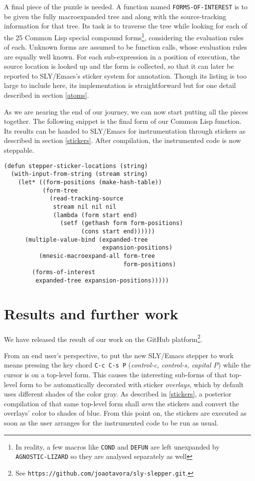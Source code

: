 \documentclass[sigconf]{acmart}
\begin{document}
A final piece of the puzzle is needed.  A function named
\texttt{FORMS-OF-INTEREST} is to be given the fully macroexpanded tree
and along with the source-tracking information for that tree.  Its
task is to traverse the tree while looking for each of the 25 Common
Lisp special compound forms\footnote{In reality, a few macros like
  \texttt{COND} and \texttt{DEFUN} are left unexpanded by
  \texttt{AGNOSTIC-LIZARD} so they are analysed separately as well},
considering the evaluation rules of each.  Unknown forms are assumed
to be function calls, whose evaluation rules are equally well known.
For each sub-expression in a position of execution, the source
location is looked up and the form is collected, so that it can later
be reported to SLY/Emacs's sticker system for annotation.  Though its
listing is too large to include here, its implementation is
straightforward but for one detail described in section \ref{atoms}.

As we are nearing the end of our journey, we can now start putting all
the pieces together. The following snippet is the final form of our
Common Lisp function. Its results can be handed to SLY/Emacs for
instrumentation through stickers as described in section
\ref{stickers}.  After compilation, the instrumented code is now
steppable.

\begin{verbatim}
(defun stepper-sticker-locations (string)
  (with-input-from-string (stream string)
    (let* ((form-positions (make-hash-table))
           (form-tree
             (read-tracking-source
              stream nil nil nil
              (lambda (form start end)
                (setf (gethash form form-positions)
                      (cons start end))))))
      (multiple-value-bind (expanded-tree
                            expansion-positions)
          (mnesic-macroexpand-all form-tree
                                  form-positions)
        (forms-of-interest
         expanded-tree expansion-positions)))))
\end{verbatim}

\section{Results and further work}\label{results}

We have released the result of our work on the GitHub
platform\footnote{See
  \texttt{https://github.com/joaotavora/sly-slepper.git}.}.

From an end user's perspective, to put the new SLY/Emacs stepper to
work means pressing the key chord \texttt{C-c C-s P} (\emph{control-c,
  control-s, capital P}) while the cursor is on a top-level form.
This causes the interesting sub-forms of that top-level form to be
automatically decorated with sticker \emph{overlays}, which by default
uses different shades of the color gray.  As described in
\ref{stickers}, a posterior compilation of that same top-level form
shall \emph{arm} the stickers and convert the overlays' color to
shades of blue.  From this point on, the stickers are executed as soon
as the user arranges for the instrumented code to be run as usual.
\end{document}
